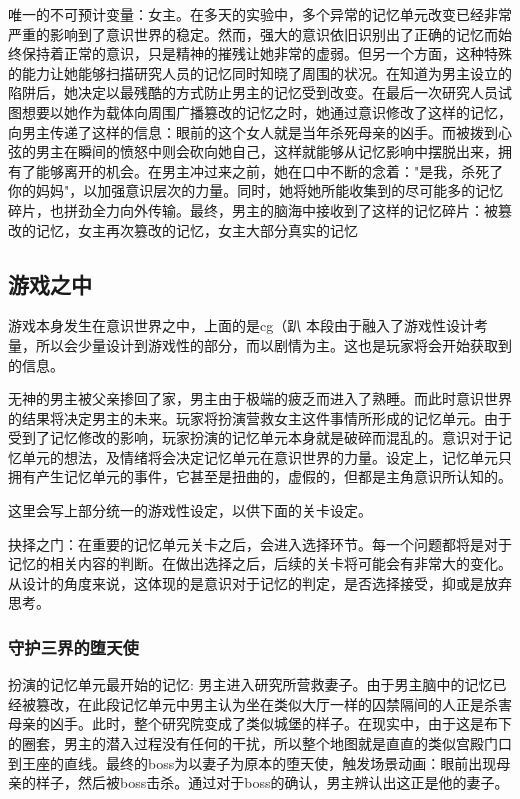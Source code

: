 \documentclass[12pt, a4paper]{article}
\begin{document}
        唯一的不可预计变量：女主。在多天的实验中，多个异常的记忆单元改变已经非常严重的影响到了意识世界的稳定。然而，强大的意识依旧识别出了正确的记忆而始终保持着正常的意识，只是精神的摧残让她非常的虚弱。但另一个方面，这种特殊的能力让她能够扫描研究人员的记忆同时知晓了周围的状况。在知道为男主设立的陷阱后，她决定以最残酷的方式防止男主的记忆受到改变。在最后一次研究人员试图想要以她作为载体向周围广播篡改的记忆之时，她通过意识修改了这样的记忆，向男主传递了这样的信息：眼前的这个女人就是当年杀死母亲的凶手。而被拨到心弦的男主在瞬间的愤怒中则会砍向她自己，这样就能够从记忆影响中摆脱出来，拥有了能够离开的机会。在男主冲过来之前，她在口中不断的念着："是我，杀死了你的妈妈"，以加强意识层次的力量。同时，她将她所能收集到的尽可能多的记忆碎片，也拼劲全力向外传输。最终，男主的脑海中接收到了这样的记忆碎片：被篡改的记忆，女主再次篡改的记忆，女主大部分真实的记忆
    
        \newpage
        \subsection*{游戏之中}
            游戏本身发生在意识世界之中，上面的是cg（趴 本段由于融入了游戏性设计考量，所以会少量设计到游戏性的部分，而以剧情为主。这也是玩家将会开始获取到的信息。

            无神的男主被父亲掺回了家，男主由于极端的疲乏而进入了熟睡。而此时意识世界的结果将决定男主的未来。玩家将扮演营救女主这件事情所形成的记忆单元。由于受到了记忆修改的影响，玩家扮演的记忆单元本身就是破碎而混乱的。意识对于记忆单元的想法，及情绪将会决定记忆单元在意识世界的力量。设定上，记忆单元只拥有产生记忆单元的事件，它甚至是扭曲的，虚假的，但都是主角意识所认知的。

            这里会写上部分统一的游戏性设定，以供下面的关卡设定。

            抉择之门：在重要的记忆单元关卡之后，会进入选择环节。每一个问题都将是对于记忆的相关内容的判断。在做出选择之后，后续的关卡将可能会有非常大的变化。从设计的角度来说，这体现的是意识对于记忆的判定，是否选择接受，抑或是放弃思考。

            \subsubsection*{守护三界的堕天使}
            扮演的记忆单元最开始的记忆: 男主进入研究所营救妻子。由于男主脑中的记忆已经被篡改，在此段记忆单元中男主认为坐在类似大厅一样的囚禁隔间的人正是杀害母亲的凶手。此时，整个研究院变成了类似城堡的样子。在现实中，由于这是布下的圈套，男主的潜入过程没有任何的干扰，所以整个地图就是直直的类似宫殿门口到王座的直线。最终的boss为以妻子为原本的堕天使，触发场景动画：眼前出现母亲的样子，然后被boss击杀。通过对于boss的确认，男主辨认出这正是他的妻子。
\end{document}
